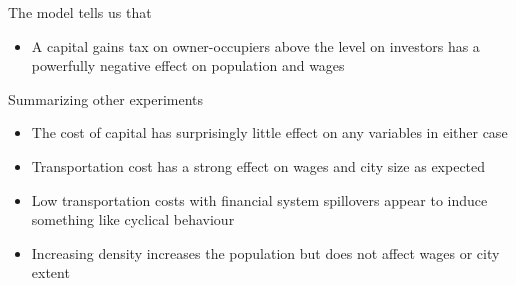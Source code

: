 \documentclass[]{beamer} %
\begin{document}
\begin{frame}{The model tells us that}  \Large
\begin {itemize}[<+-|alert@+>]
\item  A capital gains tax on owner-occupiers above the level on investors has a powerfully negative effect on population and wages
\end{itemize}
\end{frame}

\begin{frame}{Summarizing other experiments} \Large
\begin {itemize}[<+-|alert@+>]

\item  The cost of capital has surprisingly little effect on any variables in either case

\item  Transportation cost has a strong effect on wages and city size as expected 
 
\item Low transportation costs with financial system spillovers appear to induce something like cyclical behaviour

\item  Increasing density increases the population but does not affect wages or city extent
\end{itemize}
\end{frame}%
\end{document}

